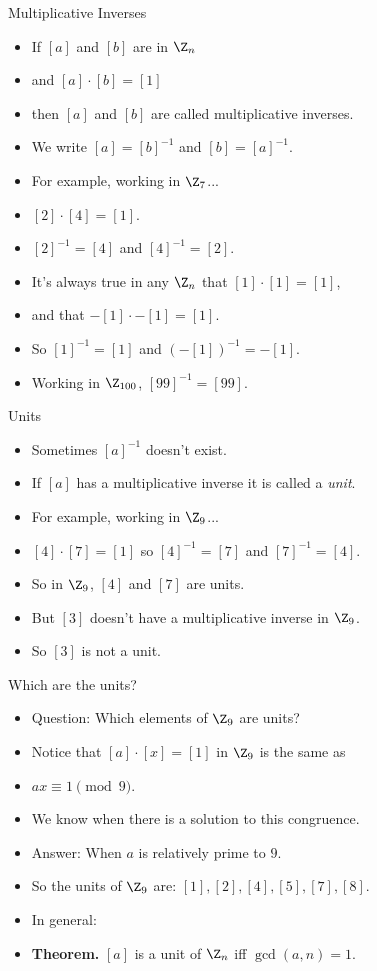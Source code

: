 \documentclass{beamer}
\begin{document}
\begin{frame}{Multiplicative Inverses}
\begin{itemize}
  \item If $[a]$ and $[b]$ are in $\Z_n$
  \item and $[a]\cdot [b] = [1]$
  \item then $[a]$ and $[b]$ are called multiplicative inverses.
  \item We write $[a] = [b]^{-1}$ and $[b] = [a]^{-1}$.
  \item For example, working in $\Z_7$...
  \item $[2]\cdot[4] = [1]$.
  \item $[2]^{-1} = [4]$ and $[4]^{-1} = [2]$.
  \item It's always true in any $\Z_n$ that $[1]\cdot[1] = [1]$,
  \item and that $-[1]\cdot-[1] = [1]$.
  \item So $[1]^{-1} = [1]$ and $(-[1])^{-1} = -[1]$.
  \item Working in $\Z_{100}$, $[99]^{-1}=[99]$.
\end{itemize}
\end{frame}

\begin{frame}{Units}
\begin{itemize}
  \item Sometimes $[a]^{-1}$ doesn't exist.
  \item If $[a]$ has a multiplicative inverse it is called a \emph{unit}.
  \item For example, working in $\Z_9$...
  \item $[4]\cdot [7] = [1]$ so $[4]^{-1} = [7]$ and $[7]^{-1} = [4]$.
  \item So in $\Z_9$, $[4]$ and $[7]$ are units.
  \item But $[3]$ doesn't have a multiplicative inverse in $\Z_9$.
  \item So $[3]$ is not a unit.
\end{itemize}
\end{frame}

\begin{frame}{Which are the units?}
\begin{itemize}
  \item Question: Which elements of $\Z_9$ are units?
  \item Notice that $[a]\cdot[x] = [1]$ in $\Z_9$ is the same as
  \item $ax \equiv 1 \pmod 9$.
  \item We know when there is a solution to this congruence.
  \item Answer: When $a$ is relatively prime to $9$.
  \item So the units of $\Z_9$ are: $[1],[2],[4],[5],[7],[8]$.
  \item In general:
  \item \textbf{Theorem.} $[a]$ is a unit of $\Z_n$ iff $\gcd(a, n) = 1$.
\end{itemize}
\end{frame}
\end{document}
